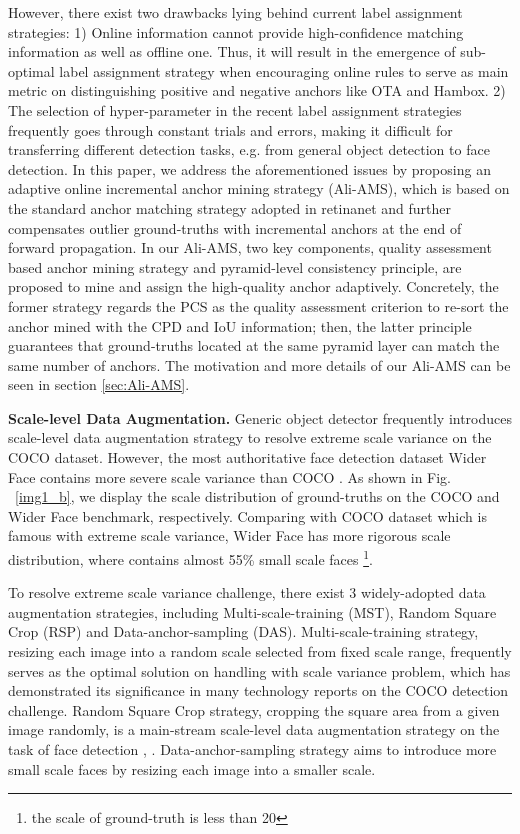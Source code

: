 \documentclass[10pt,twocolumn,letterpaper]{article}
\begin{document}
However, there exist two drawbacks lying behind current label assignment strategies: 1) Online information cannot provide high-confidence matching information as well as offline one. Thus, it will result in the emergence of sub-optimal label assignment strategy when encouraging online rules to serve as main metric on distinguishing positive and negative anchors like OTA and Hambox.
2) The selection of hyper-parameter in the recent label assignment strategies frequently goes through constant trials and errors, making it difficult for transferring different detection tasks, e.g. from general object detection to face detection.
In this paper, we address the aforementioned issues by proposing an adaptive online incremental anchor mining strategy (Ali-AMS), which is based on the standard anchor matching strategy adopted in retinanet \cite{lin2017focal} and further compensates outlier ground-truths with incremental anchors at the end of forward propagation. In our Ali-AMS, two key components, quality assessment based anchor mining strategy and pyramid-level consistency principle, are proposed to mine and assign the high-quality anchor adaptively. Concretely, 
the former strategy regards the PCS as the quality assessment criterion to re-sort the anchor mined with the CPD and IoU information; then, the latter principle guarantees that ground-truths located at the same pyramid layer can match the same number of anchors. The motivation and more details of our Ali-AMS can be seen in section \ref{sec:Ali-AMS}.

\noindent\textbf{Scale-level Data Augmentation. }
Generic object detector frequently introduces scale-level data augmentation strategy  to resolve extreme scale variance on the COCO dataset.  However, the most authoritative face detection dataset Wider Face \cite{yang2016wider} contains more severe scale variance than COCO \cite{lin2014microsoft}. As shown in Fig. ~\ref{img1_b}, we display the scale distribution of ground-truths on the COCO and Wider Face benchmark, respectively. Comparing with COCO dataset which is famous with extreme scale variance, Wider Face has more rigorous scale distribution, where contains almost 55\% small scale faces \footnote{the scale of ground-truth is less than 20}. 

To resolve extreme scale variance challenge, there exist 3 widely-adopted data augmentation strategies, including Multi-scale-training (MST), Random Square Crop (RSP) and Data-anchor-sampling (DAS).  Multi-scale-training strategy, resizing each image into a random scale selected from fixed scale range, frequently serves as the optimal solution on handling with scale variance problem, which has demonstrated its significance in many technology reports on the COCO detection challenge. Random Square Crop strategy, cropping the square area from a given image randomly, is a main-stream scale-level data augmentation strategy on the task of face detection \cite{deng2019retinaface}, \cite{zhang2017s3fd}. Data-anchor-sampling strategy \cite{tang2018pyramidbox} aims to introduce more small scale faces by resizing each image into a smaller scale.
\end{document}
